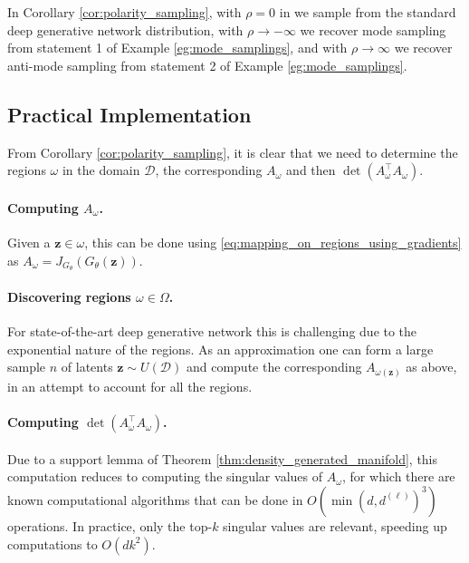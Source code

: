 \begin{remark}
    In Corollary \ref{cor:polarity_sampling}, with $\rho=0$ in we sample from the standard deep generative network distribution, with $\rho\to-\infty$ we recover mode sampling from statement 1 of Example \ref{eg:mode_samplings}, and with $\rho\to\infty$ we recover anti-mode sampling from statement 2 of Example \ref{eg:mode_samplings}. 
\end{remark}

\subsection{Practical Implementation}

From Corollary \ref{cor:polarity_sampling}, it is clear that we need to determine the regions $\omega$ in the domain $\mathcal{D}$, the corresponding $A_{\omega}$ and then $\det\left(A^\top_{\omega}A_{\omega}\right)$.

\paragraph{Computing $A_{\omega}$.} Given a $\mathbf{z}\in\omega$, this can be done using \ref{eq:mapping_on_regions_using_gradients} as $A_{\omega}=J_{G_{\theta}}\left(G_{\theta}(\mathbf{z})\right)$.

\paragraph{Discovering regions $\omega\in\Omega$.} For state-of-the-art deep generative network this is challenging due to the exponential nature of the regions. As an approximation one can form a large sample $n$ of latents $\mathbf{z}\sim U(\mathcal{D})$ and compute the corresponding $A_{\omega(\mathbf{z})}$ as above, in an attempt to account for all the regions.

\paragraph{Computing $\det\left(A_{\omega}^\top A_{\omega}\right)$.} Due to a support lemma of Theorem \ref{thm:density_generated_manifold}, this computation reduces to computing the singular values of $A_{\omega}$, for which there are known computational algorithms that can be done in $O\left(\min\left(d,d^{(\ell)}\right)^3\right)$ operations. In practice, only the top-$k$ singular values are relevant, speeding up computations to $O\left(dk^2\right)$.

